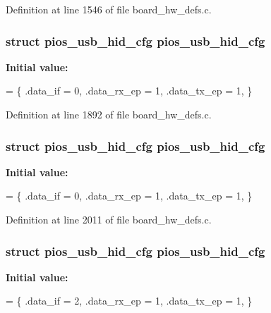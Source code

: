 Definition at line 1546 of file board\-\_\-hw\-\_\-defs.\-c.

\hypertarget{group___tau_labs_core_ga3665f6d3a2cccc431b55b9432291e94c}{
\subsubsection[{pios\-\_\-usb\-\_\-hid\-\_\-cfg}]{\setlength{\rightskip}{0pt plus 5cm}struct {\bf pios\-\_\-usb\-\_\-hid\-\_\-cfg} {\bf pios\-\_\-usb\-\_\-hid\-\_\-cfg}}}\label{group___tau_labs_core_ga3665f6d3a2cccc431b55b9432291e94c}
{\bfseries Initial value\-:}
\begin{DoxyCode}
= \{
        .data\_if = 0,
        .data\_rx\_ep = 1,
        .data\_tx\_ep = 1,
\}
\end{DoxyCode}


Definition at line 1892 of file board\-\_\-hw\-\_\-defs.\-c.

\hypertarget{group___tau_labs_core_ga3665f6d3a2cccc431b55b9432291e94c}{
\subsubsection[{pios\-\_\-usb\-\_\-hid\-\_\-cfg}]{\setlength{\rightskip}{0pt plus 5cm}struct {\bf pios\-\_\-usb\-\_\-hid\-\_\-cfg} {\bf pios\-\_\-usb\-\_\-hid\-\_\-cfg}}}\label{group___tau_labs_core_ga3665f6d3a2cccc431b55b9432291e94c}
{\bfseries Initial value\-:}
\begin{DoxyCode}
= \{
        .data\_if = 0,
        .data\_rx\_ep = 1,
        .data\_tx\_ep = 1,
\}
\end{DoxyCode}


Definition at line 2011 of file board\-\_\-hw\-\_\-defs.\-c.

\hypertarget{group___tau_labs_core_ga3665f6d3a2cccc431b55b9432291e94c}{
\subsubsection[{pios\-\_\-usb\-\_\-hid\-\_\-cfg}]{\setlength{\rightskip}{0pt plus 5cm}struct {\bf pios\-\_\-usb\-\_\-hid\-\_\-cfg} {\bf pios\-\_\-usb\-\_\-hid\-\_\-cfg}}}\label{group___tau_labs_core_ga3665f6d3a2cccc431b55b9432291e94c}
{\bfseries Initial value\-:}
\begin{DoxyCode}
= \{
        .data\_if = 2,
        .data\_rx\_ep = 1,
        .data\_tx\_ep = 1,
\}
\end{DoxyCode}


